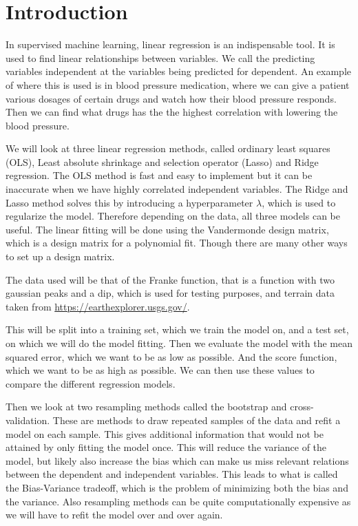 \section{Introduction}
In supervised machine learning, linear regression is an indispensable tool. It is used to find linear relationships between variables. We call the predicting variables independent at the variables being predicted for dependent. An example of where this is used is in blood pressure medication, where we can give a patient various dosages of certain drugs and watch how their blood pressure responds. Then we can find what drugs has the the highest correlation with lowering the blood pressure. 

We will look at three linear regression methods, called ordinary least squares (OLS), Least absolute shrinkage and selection operator (Lasso) and Ridge regression. The OLS method is fast and easy to implement but it can be inaccurate when we have highly correlated independent variables. The Ridge and Lasso method solves this by introducing a hyperparameter $\lambda$, which is used to regularize the model. Therefore depending on the data, all three models can be useful. The linear fitting will be done using the Vandermonde design matrix, which is a design matrix for a polynomial fit. Though there are many other ways to set up a design matrix.

The data used will be that of the Franke function, that is a function with two gaussian peaks and a dip, which is used for testing purposes, and terrain data taken from \href{https://earthexplorer.usgs.gov/}{https://earthexplorer.usgs.gov/}. 

This will be split into a training set, which we train the model on, and a test set, on which we will do the model fitting. Then we evaluate the model with the mean squared error, which we want to be as low as possible. And the score function, which we want to be as high as possible. We can then use these values to compare the different regression models.

Then we look at two resampling methods called the bootstrap and cross-validation. These are methods to draw repeated samples of the data and refit a model on each sample. This gives additional information that would not be attained by only fitting the model once. This will reduce the variance of the model, but likely also increase the bias which can make us miss relevant relations between the dependent and independent variables. This leads to what is called the Bias-Variance tradeoff, which is the problem of minimizing both the bias and the variance. Also resampling methods can be quite computationally expensive as we will have to refit the model over and over again.